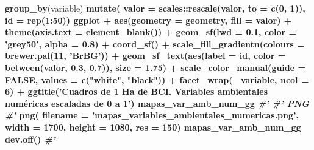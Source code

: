 \documentclass[11pt,]{article}
\newenvironment{Shaded}{\begin{snugshade}}{\end{snugshade}}
\newcommand{\KeywordTok}[1]{\textcolor[rgb]{0.13,0.29,0.53}{\textbf{#1}}}
\newcommand{\DataTypeTok}[1]{\textcolor[rgb]{0.13,0.29,0.53}{#1}}
\newcommand{\DecValTok}[1]{\textcolor[rgb]{0.00,0.00,0.81}{#1}}
\newcommand{\FloatTok}[1]{\textcolor[rgb]{0.00,0.00,0.81}{#1}}
\newcommand{\StringTok}[1]{\textcolor[rgb]{0.31,0.60,0.02}{#1}}
\newcommand{\CommentTok}[1]{\textcolor[rgb]{0.56,0.35,0.01}{\textit{#1}}}
\newcommand{\OtherTok}[1]{\textcolor[rgb]{0.56,0.35,0.01}{#1}}
\newcommand{\OperatorTok}[1]{\textcolor[rgb]{0.81,0.36,0.00}{\textbf{#1}}}
\newcommand{\NormalTok}[1]{#1}
\begin{document}
\begin{Shaded}
\begin{Highlighting}[]
{{{{{\StringTok{  }\KeywordTok{group_by}\NormalTok{(variable) }\OperatorTok{%
\StringTok{  }\KeywordTok{mutate}\NormalTok{(}
    \DataTypeTok{valor =}\NormalTok{ scales}\OperatorTok{::}\KeywordTok{rescale}\NormalTok{(valor, }\DataTypeTok{to =} \KeywordTok{c}\NormalTok{(}\DecValTok{0}\NormalTok{, }\DecValTok{1}\NormalTok{)),}
    \DataTypeTok{id =} \KeywordTok{rep}\NormalTok{(}\DecValTok{1}\OperatorTok{:}\DecValTok{50}\NormalTok{)) }\OperatorTok{%
\StringTok{  }\NormalTok{ggplot }\OperatorTok{+}
\StringTok{  }\KeywordTok{aes}\NormalTok{(}\DataTypeTok{geometry =}\NormalTok{ geometry, }\DataTypeTok{fill =}\NormalTok{ valor) }\OperatorTok{+}
\StringTok{  }\KeywordTok{theme}\NormalTok{(}\DataTypeTok{axis.text =} \KeywordTok{element_blank}\NormalTok{()) }\OperatorTok{+}
\StringTok{  }\KeywordTok{geom_sf}\NormalTok{(}\DataTypeTok{lwd =} \FloatTok{0.1}\NormalTok{, }\DataTypeTok{color =} \StringTok{'grey50'}\NormalTok{, }\DataTypeTok{alpha =} \FloatTok{0.8}\NormalTok{) }\OperatorTok{+}\StringTok{ }\KeywordTok{coord_sf}\NormalTok{() }\OperatorTok{+}
\StringTok{  }\KeywordTok{scale_fill_gradientn}\NormalTok{(}\DataTypeTok{colours =} \KeywordTok{brewer.pal}\NormalTok{(}\DecValTok{11}\NormalTok{, }\StringTok{'BrBG'}\NormalTok{)) }\OperatorTok{+}
\StringTok{  }\KeywordTok{geom_sf_text}\NormalTok{(}\KeywordTok{aes}\NormalTok{(}\DataTypeTok{label =}\NormalTok{ id, }\DataTypeTok{color =} \KeywordTok{between}\NormalTok{(valor, }\FloatTok{0.3}\NormalTok{, }\FloatTok{0.7}\NormalTok{)), }\DataTypeTok{size =} \FloatTok{1.75}\NormalTok{) }\OperatorTok{+}
\StringTok{  }\KeywordTok{scale_color_manual}\NormalTok{(}\DataTypeTok{guide =} \OtherTok{FALSE}\NormalTok{, }\DataTypeTok{values =} \KeywordTok{c}\NormalTok{(}\StringTok{"white"}\NormalTok{, }\StringTok{"black"}\NormalTok{)) }\OperatorTok{+}
\StringTok{  }\KeywordTok{facet_wrap}\NormalTok{(}\OperatorTok{~}\StringTok{ }\NormalTok{variable, }\DataTypeTok{ncol =} \DecValTok{6}\NormalTok{) }\OperatorTok{+}\StringTok{ }
\StringTok{  }\KeywordTok{ggtitle}\NormalTok{(}\StringTok{'Cuadros de 1 Ha de BCI. Variables ambientales numéricas escaladas de 0 a 1'}\NormalTok{)}
\NormalTok{mapas_var_amb_num_gg}
\CommentTok{#'}
\CommentTok{#' PNG}
\CommentTok{#'}
\KeywordTok{png}\NormalTok{(}
  \DataTypeTok{filename =} \StringTok{'mapas_variables_ambientales_numericas.png'}\NormalTok{,}
  \DataTypeTok{width =} \DecValTok{1700}\NormalTok{, }\DataTypeTok{height =} \DecValTok{1080}\NormalTok{, }\DataTypeTok{res =} \DecValTok{150}\NormalTok{)}
\NormalTok{mapas_var_amb_num_gg}
\KeywordTok{dev.off}\NormalTok{()}
\CommentTok{#' }
}}}}}}}
\end{Highlighting}
\end{Shaded}
\end{document}
